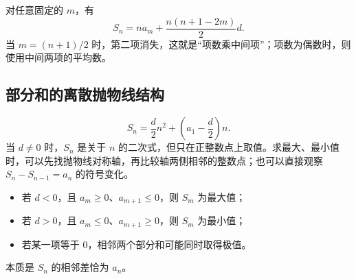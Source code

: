 \begin{corollarybox}[从任意一项表示和]
  对任意固定的 $m$，有
  \[
    S_n=na_m+\frac{n(n+1-2m)}2d.
  \]
  当 $m=(n+1)/2$ 时，第二项消失，这就是“项数乘中间项”；项数为偶数时，则使用中间两项的平均数。
\end{corollarybox}

\subsection{部分和的离散抛物线结构}

\[
  S_n=\frac d2n^2+\left(a_1-\frac d2\right)n.
\]
当 $d\ne0$ 时，$S_n$ 是关于 $n$ 的二次式，但只在正整数点上取值。求最大、最小值时，可以先找抛物线对称轴，再比较轴两侧相邻的整数点；也可以直接观察 $S_n-S_{n-1}=a_n$ 的符号变化。

\begin{corollarybox}
  \begin{itemize}
    \item 若 $d<0$，且 $a_m\ge0$、$a_{m+1}\le0$，则 $S_m$ 为最大值；
    \item 若 $d>0$，且 $a_m\le0$、$a_{m+1}\ge0$，则 $S_m$ 为最小值；
    \item 若某一项等于 $0$，相邻两个部分和可能同时取得极值。
  \end{itemize}
  本质是 $S_n$ 的相邻差恰为 $a_n$。
\end{corollarybox}

